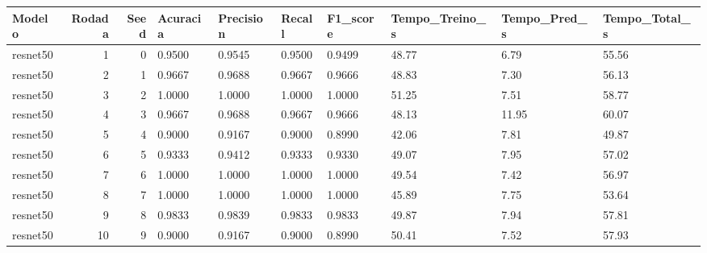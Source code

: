 \begin{tabular}{lrrlllllll}
\toprule
Modelo & Rodada & Seed & Acuracia & Precision & Recall & F1_score & Tempo_Treino_s & Tempo_Pred_s & Tempo_Total_s \\
\midrule
resnet50 & 1 & 0 & 0.9500 & 0.9545 & 0.9500 & 0.9499 & 48.77 & 6.79 & 55.56 \\
resnet50 & 2 & 1 & 0.9667 & 0.9688 & 0.9667 & 0.9666 & 48.83 & 7.30 & 56.13 \\
resnet50 & 3 & 2 & 1.0000 & 1.0000 & 1.0000 & 1.0000 & 51.25 & 7.51 & 58.77 \\
resnet50 & 4 & 3 & 0.9667 & 0.9688 & 0.9667 & 0.9666 & 48.13 & 11.95 & 60.07 \\
resnet50 & 5 & 4 & 0.9000 & 0.9167 & 0.9000 & 0.8990 & 42.06 & 7.81 & 49.87 \\
resnet50 & 6 & 5 & 0.9333 & 0.9412 & 0.9333 & 0.9330 & 49.07 & 7.95 & 57.02 \\
resnet50 & 7 & 6 & 1.0000 & 1.0000 & 1.0000 & 1.0000 & 49.54 & 7.42 & 56.97 \\
resnet50 & 8 & 7 & 1.0000 & 1.0000 & 1.0000 & 1.0000 & 45.89 & 7.75 & 53.64 \\
resnet50 & 9 & 8 & 0.9833 & 0.9839 & 0.9833 & 0.9833 & 49.87 & 7.94 & 57.81 \\
resnet50 & 10 & 9 & 0.9000 & 0.9167 & 0.9000 & 0.8990 & 50.41 & 7.52 & 57.93 \\
\bottomrule
\end{tabular}
